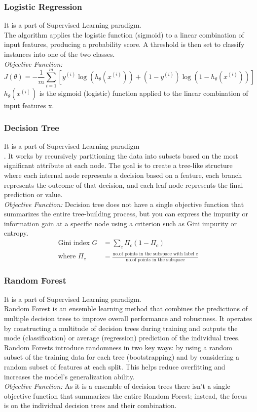 \subsubsection{Logistic Regression}
It is a part of Supervised Learning paradigm.\\
The algorithm applies the logistic function (sigmoid) to a linear combination of input features, producing a probability score. A threshold is then set to classify instances into one of the two classes.\\
\textit{Objective Function:}
\begin{equation}
    J(\theta) = -\frac{1}{m} \sum_{i=1}^m \left[ y^{(i)} \log(h_\theta(x^{(i)})) + (1 - y^{(i)}) \log(1 - h_\theta(x^{(i)})) \right]
\end{equation}
$h_\theta(x^{(i)})$ is the sigmoid (logistic) function applied to the
linear combination of input features x.
\subsubsection{Decision Tree}
It is a part of Supervised Learning paradigm\\.
It works by recursively partitioning the data into subsets based on the most significant attribute at each node. The goal is to create a tree-like structure where each internal node represents a decision based on a feature, each branch represents the outcome of that decision, and each leaf node represents the final prediction or value.\\
\textit{Objective Function:} Decision tree does not have a single objective function that summarizes the entire tree-building process, but you can express the impurity or information gain at a specific node using a criterion such as Gini impurity or entropy.
\begin{align}
    \text{Gini index } G &= \sum_c \Pi_c (1 - \Pi_c)\\
    \text{where } \Pi_c &= \frac{\text{no.of points in the subspace with label c}}{\text{no.of points in the subspace}}
\end{align}
\subsubsection{Random Forest}
It is a part of Supervised Learning paradigm.\\
Random Forest is an ensemble learning method that combines the predictions of multiple decision trees to improve overall performance and robustness. It operates by constructing a multitude of decision trees during training
and outputs the mode (classification) or average (regression) prediction of the individual trees. Random Forests introduce randomness in two key ways: by using a random subset of the training data for each tree (bootstrapping) and by considering a random subset of features at each split. This helps reduce overfitting and increases the model’s generalization ability.\\
\textit{Objective Function:} As it is a ensemble of decision
trees there isn’t a single objective function that summarizes
the entire Random Forest; instead, the focus is on the
individual decision trees and their combination.
